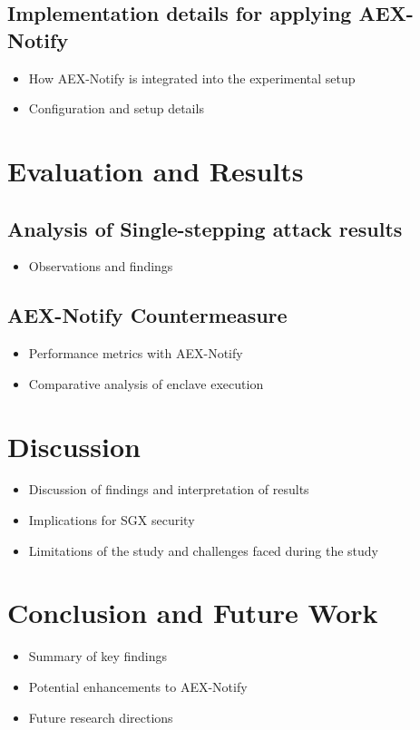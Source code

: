 \documentclass{llncs}
\begin{document}
\subsection{Implementation details for applying AEX-Notify}
\begin{itemize}
  \item How AEX-Notify is integrated into the experimental setup
  \item Configuration and setup details
\end{itemize}



\section{Evaluation and Results}
\subsection{Analysis of Single-stepping attack results}
\begin{itemize}
    \item Observations and findings
\end{itemize}
\subsection{AEX-Notify Countermeasure}
\begin{itemize}
    \item Performance metrics with AEX-Notify
    \item Comparative analysis of enclave execution
\end{itemize}

\section{Discussion}
\begin{itemize}
  \item Discussion of findings and interpretation of results
  \item Implications for SGX security
  \item Limitations of the study and challenges faced during the study
\end{itemize}

\section{Conclusion and Future Work}
\begin{itemize}
    \item Summary of key findings
    \item Potential enhancements to AEX-Notify
    \item Future research directions
\end{itemize}


%

\end{document}
